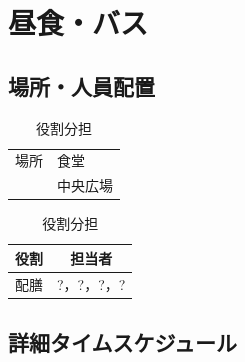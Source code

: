\newpage

\section{昼食・バス}  %

\subsection{場所・人員配置}
\begin{table}[h]
  \centering
  \begin{minipage}[t]{0.48\columnwidth}
    \centering
    \caption{場所・該当グループ}
    \begin{tabular}{cl}
      \hline
      場所 & 食堂 \\
      & 中央広場 \\
      \hline
    \end{tabular}
  \end{minipage}
  \begin{minipage}[t]{0.48\columnwidth}
    \centering
    \caption{役割分担}
    \begin{tabular}{ll}
      \hline
      \multicolumn{1}{c}{役割} & \multicolumn{1}{c}{担当者} \\
      \hline
      配膳 & ?，?，?，? \\
      \hline
    \end{tabular}
  \end{minipage}
\end{table}

\subsection{詳細タイムスケジュール}
\vspace{0.5em}
\fontsize{8pt}{12pt}\selectfont

